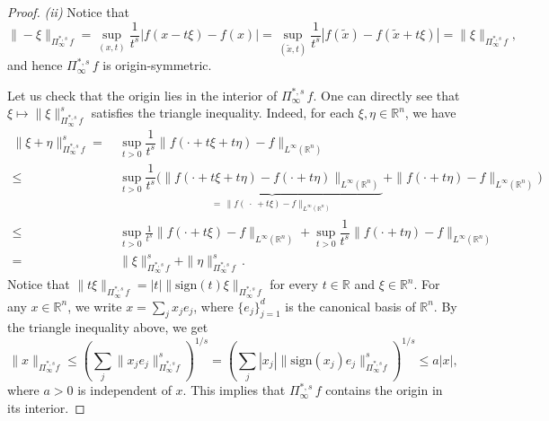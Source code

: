 \documentclass[10pt,a4paper]{amsart}
\newcommand{\R}{\mathbb{R}}
\begin{document}
\begin{proof}
    \medskip
    
    \textit{(ii)} 
    Notice that 
    \[
        \| - \xi \|_{\Pi^{\ast, s}_\infty \, f} = \sup_{(x, t)} \dfrac{1}{t^s} |f(x - t\xi) - f(x)| = \sup_{(\tilde x, t)} \dfrac{1}{t^s} |f(\tilde x) - f(\tilde x + t\xi)| = \| \xi \|_{\Pi^{\ast, s}_\infty \, f},
    \]
    and hence $\Pi^{\ast, s}_\infty \, f$ is origin-symmetric.
    
    \medskip

    Let us check that the origin lies in the interior of $\Pi^{\ast, s}_\infty \, f$.
    One can directly see that $\xi \mapsto \| \xi \|_{\Pi^{\ast, s}_\infty \, f}^s$ satisfies the triangle inequality.
    Indeed, for each $\xi, \eta \in \R^n$, we have
    \begin{align*}
        \| \xi + \eta \|_{\Pi^{\ast, s}_\infty \, f}^s 
        = & ~ 
        \sup_{t > 0}
        \dfrac{1}{t^s} \| f(\cdot + t\xi + t\eta) - f \|_{L^\infty(\R^n)} \\
        \leq & ~
        \sup_{t > 0} 
        \dfrac{1}{t^s} \Big(
        \underbrace{\| f(\cdot + t\xi + t\eta) - f(\cdot + t \eta) \|_{L^\infty(\R^n)}}_{ = \, \| f(~\cdot~ + t\xi) - f \|_{L^\infty(\R^n)}} 
        + 
        \| f(\cdot + t\eta) - f \|_{L^\infty(\R^n)} 
        \Big) 
        \\
        \leq & ~ 
        \sup_{t > 0} \frac{1}{t^s} \| f(\cdot + t\xi) - f \|_{L^\infty(\R^n)} + \sup_{t > 0} \dfrac{1}{t^s}\| f(\cdot + t\eta) - f \|_{L^\infty(\R^n)} \\
        = & ~
        \| \xi \|^s_{\Pi^{\ast, s}_\infty \, f} 
        + \| \eta \|^s_{\Pi^{\ast, s}_\infty \, f} \,.
    \end{align*}
 	Notice that $\| t \xi \|_{\Pi^{\ast, s}_\infty \, f} = |t| \| \mathrm{sign}(t)\xi \|_{\Pi^{\ast, s}_\infty \, f}$ for every $t \in \R$ and $\xi \in \R^n$.
 	For any $x \in \R^n$, we write $x = \textstyle\sum_j x_j e_j$, where $\{ e_j \}_{j = 1}^d$ is the canonical basis of $\R^n$.
 	By the triangle inequality above, we get
 	\begin{equation}\label{origin-interior}
 		\| x \|_{\Pi^{\ast, s}_\infty f} \leq \left( \sum_j \| x_j e_j \|_{\Pi^{\ast, s}_\infty f}^s \right)^{1/s} = \left( \sum_j |x_j| \| \mathrm{sign}(x_j) e_j \|^s_{\Pi^{\ast, s}_\infty f}  \right)^{1/s} \leq a |x|,
 	\end{equation}
where $a > 0$ is independent of $x$. 
	This implies that $\Pi^{\ast, s}_\infty \, f$ contains the origin in its interior.


\end{proof}
\end{document}
